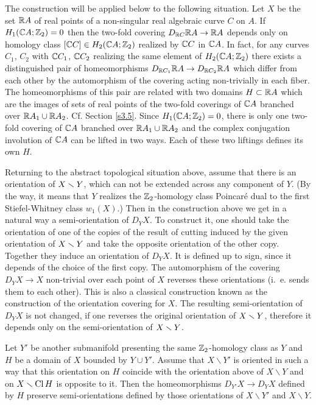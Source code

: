 \documentclass{article}
\numberwithin{equation}{section}
\begin{document}
The construction will be applied below to the following situation. Let
$X$ be the set $\mathbb R A$ of real points of a non-singular real
algebraic curve $C$ on $A$. If $H_1(\mathbb C A; \mathbb Z_2)=0$ then the two-fold
covering $D_{\mathbb R C}\mathbb R A\to\mathbb R A$ depends only on homology class $[\mathbb C
C]\in H_2(\mathbb C A;\mathbb Z_2)$ realized by $\mathbb C C$ in $\mathbb C A$. In fact, for any
curves $C_1$, $C_2$ with $\mathbb C C_1$, $\mathbb C C_2$ realizing the same element
of $H_2(\mathbb C A;\mathbb Z_2)$ there exists a distinguished pair of homeomorphisms
$D_{\mathbb R C_1}\mathbb R A\to D_{\mathbb R C_2}\mathbb R A$ which differ from each other by the
automorphism of the covering acting non-trivially in each fiber. The
homeomorphisms of this pair are related with two domains $H\subset\mathbb R A$
which are the images of sets of real points of the two-fold coverings
of $\mathbb C A$ branched over $\mathbb R A_1\cup \mathbb R A_2$. Cf. Section \ref{s3.5}. Since
$H_1(\mathbb C A;\mathbb Z_2)=0$, there is only one two-fold covering of $\mathbb C A$
branched over $\mathbb R A_1\cup \mathbb R A_2$ and the complex conjugation
involution of $\mathbb C A$ can be lifted in two ways. Each of these two
liftings defines its own $H$.

Returning to the abstract topological situation above, assume that
there is an orientation
of $X\smallsetminus Y$, which can not be extended across any component of $Y$.
(By the way, it means that $Y$ realizes the $\mathbb Z_2$-homology class
Poincar\'{e} dual to the first Stiefel-Whitney class $w_1(X)$.) Then in
the construction above we get in a natural way a semi-orientation of
$D_YX$. To construct it, one should take the orientation of one of the
copies of the result of cutting induced by the given orientation of
$X\smallsetminus Y$ and take the opposite orientation of the other copy.
Together they induce an orientation of $D_YX$. It is defined up to
sign, since it depends of the choice of the first copy. The
automorphism of the covering $D_YX\to X$ non-trivial over each point of
$X$ reverses these orientations (i.~e. sends them to each other).  This
is also a classical construction known as the construction of the
orientation covering for $X$.  The resulting semi-orientation of $D_YX$
is not changed, if one reverses the original orientation of $X\smallsetminus
Y$, therefore it depends only on the semi-orientation of $X\smallsetminus Y$.

Let $Y'$ be another submanifold presenting the same $\mathbb Z_2$-homology
class as $Y$ and $H$ be a domain of $X$ bounded by $Y\cup Y'$. Assume
that $X\smallsetminus Y'$ is oriented in such a way that this
orientation on $H$ coincide with the orientation above of
$X\smallsetminus Y$ and on $X\smallsetminus\operatorname{Cl} H$ is opposite to it.
Then the homeomorphisms $D_{Y'}X\to D_Y X$ defined by $H$ preserve
semi-orientations defined by those orientations of $X\smallsetminus Y'$
and $X\smallsetminus Y$.
\end{document}
